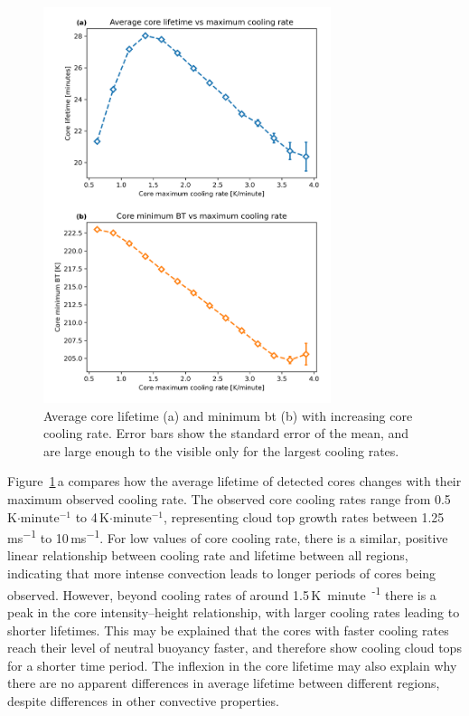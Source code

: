 \begin{figure}[tp]
    \centering
    \includegraphics[width=0.75\textwidth]{figures/chapter2_10.png}
    \caption[
    Average core lifetime and minimum \acrshort{bt} with increasing core cooling rate
    ]{
    Average core lifetime (a) and minimum \acrshort{bt} (b) with increasing core cooling rate. Error bars show the standard error of the mean, and are large enough to the visible only for the largest cooling rates.
    }
    \label{fig:core_cooling_rate_relations}
\end{figure}


Figure~\ref{fig:core_cooling_rate_relations}\,a compares how the average lifetime of detected cores changes with their maximum observed cooling rate.
The observed core cooling rates range from 0.5\,K$\mathrm{\cdot minute^{-1}}$ to 4\,K$\mathrm{\cdot minute^{-1}}$, representing cloud top growth rates between 1.25\,\unit{ms^{-1}} to 10\,\unit{ms^{-1}}.
For low values of core cooling rate, there is a similar, positive linear relationship between cooling rate and lifetime between all regions, indicating that more intense convection leads to longer periods of cores being observed.
However, beyond cooling rates of around 1.5\,\unit{K minute\textsuperscript{-1}} there is a peak in the core intensity--height relationship, with larger cooling rates leading to shorter lifetimes.
This may be explained that the cores with faster cooling rates reach their level of neutral buoyancy faster, and therefore show cooling cloud tops for a shorter time period.
The inflexion in the core lifetime may also explain why there are no apparent differences in average lifetime between different regions, despite differences in other convective properties.

